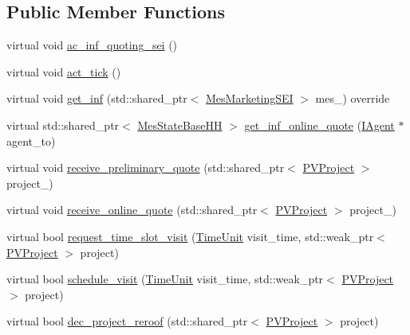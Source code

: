 \subsection*{Public Member Functions}
{\bf }\par
\begin{DoxyCompactItemize}
\item 
virtual void \hyperlink{classsolar__core_1_1_household_a165b7c64c72e5ed4ea08307e32082517}{ac\+\_\+inf\+\_\+quoting\+\_\+sei} ()
\item 
virtual void \hyperlink{classsolar__core_1_1_household_a1e7d20a60dc42b8d09a8d23a4cdb26a6}{act\+\_\+tick} ()
\end{DoxyCompactItemize}

{\bf }\par
\begin{DoxyCompactItemize}
\item 
virtual void \hyperlink{classsolar__core_1_1_household_ac9d26af7b52f0cdc357fc5dca4b86ad9}{get\+\_\+inf} (std\+::shared\+\_\+ptr$<$ \hyperlink{classsolar__core_1_1_mes_marketing_s_e_i}{Mes\+Marketing\+S\+E\+I} $>$ mes\+\_\+) override
\end{DoxyCompactItemize}

{\bf }\par
\begin{DoxyCompactItemize}
\item 
virtual std\+::shared\+\_\+ptr$<$ \hyperlink{classsolar__core_1_1_mes_state_base_h_h}{Mes\+State\+Base\+H\+H} $>$ \hyperlink{classsolar__core_1_1_household_a008a18ff8c2d15da72e19876dc896a4e}{get\+\_\+inf\+\_\+online\+\_\+quote} (\hyperlink{classsolar__core_1_1_i_agent}{I\+Agent} $\ast$agent\+\_\+to)
\item 
virtual void \hyperlink{classsolar__core_1_1_household_a31a1c8d006fb9e95a2460aa392eaa830}{receive\+\_\+preliminary\+\_\+quote} (std\+::shared\+\_\+ptr$<$ \hyperlink{classsolar__core_1_1_p_v_project}{P\+V\+Project} $>$ project\+\_\+)
\item 
virtual void \hyperlink{classsolar__core_1_1_household_a306aed410a39e8062ab5f1b4a3216b8b}{receive\+\_\+online\+\_\+quote} (std\+::shared\+\_\+ptr$<$ \hyperlink{classsolar__core_1_1_p_v_project}{P\+V\+Project} $>$ project\+\_\+)
\item 
virtual bool \hyperlink{classsolar__core_1_1_household_a8c9635bac11c9bd93e65dbb5be5b9d85}{request\+\_\+time\+\_\+slot\+\_\+visit} (\hyperlink{namespacesolar__core_a4b5949d07259da6f8a20d12a30403e90}{Time\+Unit} visit\+\_\+time, std\+::weak\+\_\+ptr$<$ \hyperlink{classsolar__core_1_1_p_v_project}{P\+V\+Project} $>$ project)
\item 
virtual bool \hyperlink{classsolar__core_1_1_household_a8d4b9c4a5cf59c93f33489eccbfba7db}{schedule\+\_\+visit} (\hyperlink{namespacesolar__core_a4b5949d07259da6f8a20d12a30403e90}{Time\+Unit} visit\+\_\+time, std\+::weak\+\_\+ptr$<$ \hyperlink{classsolar__core_1_1_p_v_project}{P\+V\+Project} $>$ project)
\item 
virtual bool \hyperlink{classsolar__core_1_1_household_aa63241ca3fcc1f2374d10b5c7f44124a}{dec\+\_\+project\+\_\+reroof} (std\+::shared\+\_\+ptr$<$ \hyperlink{classsolar__core_1_1_p_v_project}{P\+V\+Project} $>$ project)
\end{DoxyCompactItemize}

